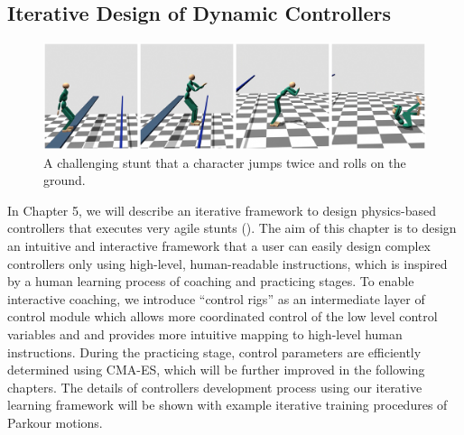 \subsection{Iterative Design of Dynamic Controllers}
\begin{figure}[h]
  \begin{center}
    \includegraphics[width=1.0\textwidth]{images/intro_drop_roll}
  \end{center}
  \caption{A challenging stunt that a character jumps twice and rolls
    on the ground.}
  \label{fig:intro_drop_roll}
\end{figure}

In Chapter 5, we will describe an iterative framework to design physics-based
controllers that executes very agile stunts ().
The aim of this chapter is to design an intuitive and interactive framework
that a user can easily design complex controllers only using high-level,
human-readable instructions, 
which is inspired by a human learning process of coaching and practicing stages.
To enable interactive coaching, we introduce ``control rigs'' as
an intermediate layer of control module which allows more coordinated control
of the low level control variables and and provides more intuitive mapping to
high-level human instructions. 
During the practicing stage, control parameters are efficiently determined
using CMA-ES, which will be further improved in the following chapters.
The details of controllers development process using our iterative learning
framework will be shown with example iterative training procedures of Parkour
motions.

